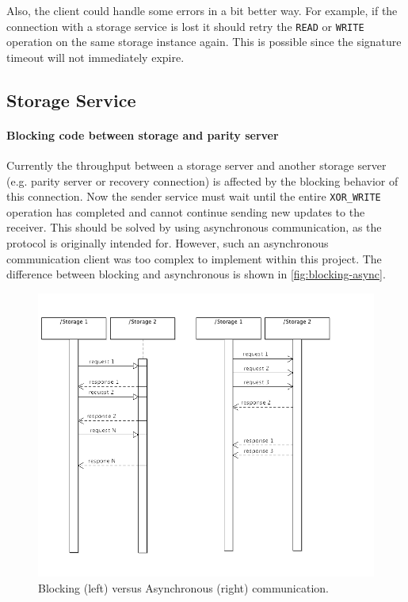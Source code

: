 \documentclass[12pt,a4paper]{scrartcl}
\begin{document}
Also, the client could handle some errors in a bit better way. For example, if the connection with a storage service is lost it should retry the \verb|READ| or \verb|WRITE| operation on the same storage instance again. This is possible since the signature timeout will not immediately expire.

\subsection{Storage Service}
\paragraph{Blocking code between storage and parity server}
Currently the throughput between a storage server and another storage server (e.g. parity server or recovery connection) is affected by the blocking behavior of this connection. Now the sender service must wait until the entire \verb|XOR_WRITE| operation has completed and cannot continue sending new updates to the receiver. This should be solved by using asynchronous communication, as the protocol is originally intended for. However, such an asynchronous communication client was too complex to implement within this project. The difference between blocking and asynchronous is shown in \autoref{fig:blocking-async}.

\begin{figure}[H]
\centering
\includegraphics[width=\textwidth,trim=0 8cm 0 0,clip=true]{diagrams/blocking-async.png}
\caption{Blocking (left) versus Asynchronous (right) communication.}
\label{fig:blocking-async}
\end{figure}
\end{document}
